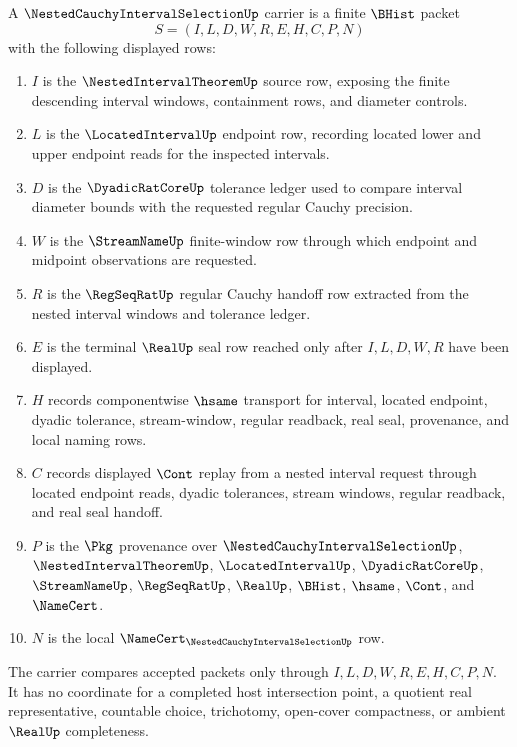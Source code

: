 \begin{definition}
\label{def:nested-cauchy-interval-selection-carrier}
A $\NestedCauchyIntervalSelectionUp$ carrier is a finite $\BHist$ packet
$$
S=(I,L,D,W,R,E,H,C,P,N)
$$
with the following displayed rows:
\begin{enumerate}
\item $I$ is the $\NestedIntervalTheoremUp$ source row, exposing the finite descending interval windows, containment rows, and diameter controls.
\item $L$ is the $\LocatedIntervalUp$ endpoint row, recording located lower and upper endpoint reads for the inspected intervals.
\item $D$ is the $\DyadicRatCoreUp$ tolerance ledger used to compare interval diameter bounds with the requested regular Cauchy precision.
\item $W$ is the $\StreamNameUp$ finite-window row through which endpoint and midpoint observations are requested.
\item $R$ is the $\RegSeqRatUp$ regular Cauchy handoff row extracted from the nested interval windows and tolerance ledger.
\item $E$ is the terminal $\RealUp$ seal row reached only after $I,L,D,W,R$ have been displayed.
\item $H$ records componentwise $\hsame$ transport for interval, located endpoint, dyadic tolerance, stream-window, regular readback, real seal, provenance, and local naming rows.
\item $C$ records displayed $\Cont$ replay from a nested interval request through located endpoint reads, dyadic tolerances, stream windows, regular readback, and real seal handoff.
\item $P$ is the $\Pkg$ provenance over $\NestedCauchyIntervalSelectionUp$, $\NestedIntervalTheoremUp$, $\LocatedIntervalUp$, $\DyadicRatCoreUp$, $\StreamNameUp$, $\RegSeqRatUp$, $\RealUp$, $\BHist$, $\hsame$, $\Cont$, and $\NameCert$.
\item $N$ is the local $\NameCert_{\NestedCauchyIntervalSelectionUp}$ row.
\end{enumerate}
The carrier compares accepted packets only through $I,L,D,W,R,E,H,C,P,N$. It has no coordinate for a completed host intersection point, a quotient real representative, countable choice, trichotomy, open-cover compactness, or ambient $\RealUp$ completeness.
\end{definition}


